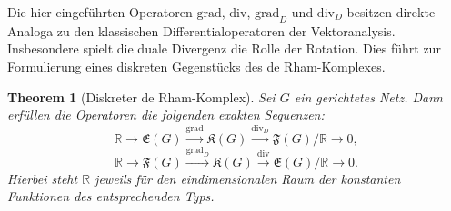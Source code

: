 \documentclass[11pt,a4paper,leqno]{report}
\newtheorem{theorem}{Theorem}[chapter]
\numberwithin{equation}{chapter}
\begin{document}
Die hier eingeführten Operatoren $\mathrm{grad}$, $\mathrm{div}$, 
$\mathrm{grad}_D$ und $\mathrm{div}_D$ besitzen direkte Analoga zu den klassischen Differentialoperatoren der Vektoranalysis. 
Insbesondere spielt die duale Divergenz die Rolle der Rotation. 
Dies führt zur Formulierung eines diskreten Gegenstücks des de Rham-Komplexes.
\begin{theorem}[Diskreter de Rham-Komplex]
	Sei $G$ ein gerichtetes Netz. 
	Dann erfüllen die Operatoren die folgenden exakten Sequenzen:
	\begin{equation} \label{eq:derham1}
		\mathbb{R}\longrightarrow \mathfrak{E}(G) 
		\overset{\mathrm{grad}}{\longrightarrow} \mathfrak{K}(G) 
		\overset{\mathrm{div}_D}{\longrightarrow} \mathfrak{F}(G)/\mathbb{R} 
		\longrightarrow 0,
	\end{equation}
	\begin{equation} \label{eq:derham2}
		\mathbb{R}\longrightarrow \mathfrak{F}(G) 
		\overset{\mathrm{grad}_D}{\longrightarrow} \mathfrak{K}(G) 
		\overset{\mathrm{div}}{\longrightarrow} \mathfrak{E}(G)/\mathbb{R} 
		\longrightarrow 0.
	\end{equation}
	Hierbei steht $\mathbb{R}$ jeweils für den eindimensionalen Raum der konstanten Funktionen des entsprechenden Typs.
\end{theorem}
\end{document}
